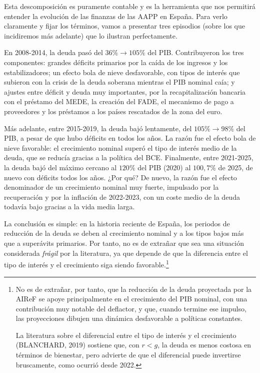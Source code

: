 \documentclass[10pt,a4paper]{article}
\begin{document}
Esta descomposición es puramente contable y es la herramienta que nos permitirá entender la evolución de las finanzas de las AAPP en España. Para verlo claramente y fijar los términos, vamos a presentar tres episodios (sobre los que incidiremos más adelante) que lo ilustran perfectamente.

En 2008-2014, la deuda pasó del $36\%\to105\%$ del PIB. Contribuyeron los tres componentes: grandes déficits primarios por la caída de los ingresos y los estabilizadores; un efecto bola de nieve desfavorable, con tipos de interés que subieron con la crisis de la deuda soberana mientras el PIB nominal caía; y ajustes entre déficit y deuda muy importantes, por la recapitalización bancaria con el préstamo del MEDE, la creación del FADE, el mecanismo de pago a proveedores y los préstamos a los países rescatados de la zona del euro.

Más adelante, entre 2015-2019, la deuda bajó lentamente, del $105\%\to98\%$ del PIB, a pesar de que hubo déficits en todos los años. La razón fue el efecto bola de nieve favorable: el crecimiento nominal superó el tipo de interés medio de la deuda, que se reducía gracias a la política del BCE. Finalmente, entre 2021-2025, la deuda bajó del máximo cercano al $120\%$ del PIB (2020) al $100,7\%$ de 2025, de nuevo con déficits todos los años. ¿Por qué? De nuevo, la razón fue el efecto denominador de un crecimiento nominal muy fuerte, impulsado por la recuperación y por la inflación de 2022-2023, con un coste medio de la deuda todavía bajo gracias a la vida media larga.

La conclusión es simple: en la historia reciente de España, los periodos de reducción de la deuda se deben al crecimiento nominal y a los tipos bajos más que a superávits primarios. Por tanto, no es de extrañar que sea una situación considerada \textit{frágil} por la literatura, ya que depende de que la diferencia entre el tipo de interés y el crecimiento siga siendo favorable.\footnote{
No es de extrañar, por tanto, que la reducción de la deuda proyectada por la AIReF se apoye principalmente en el crecimiento del PIB nominal, con una contribución muy notable del deflactor, y que, cuando termine ese impulso, las proyecciones dibujen una dinámica desfavorable a políticas constantes.

La literatura sobre el diferencial entre el tipo de interés y el crecimiento (BLANCHARD, 2019) sostiene que, con $r < g$, la deuda es menos costosa en términos de bienestar, pero advierte de que el diferencial puede invertirse bruscamente, como ocurrió desde 2022.
} 
\end{document}
